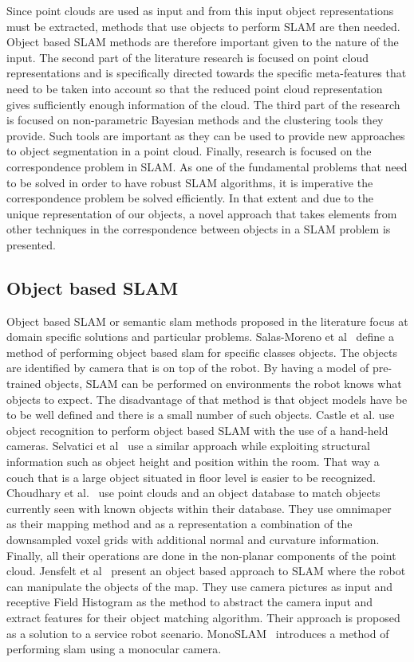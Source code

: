 \documentclass[twoside,hidelinks]{article}
\begin{document}
Since point clouds are used as input and from this input object representations must be extracted, methods that use objects to perform SLAM are then needed. Object based SLAM methods are therefore important given to the nature of the input. The second part of the literature research is focused on point cloud representations and is specifically directed towards the specific meta-features that need to be taken into account so that the reduced point cloud representation gives sufficiently enough information of the cloud. The third part of the research is focused on non-parametric Bayesian methods and the clustering tools they provide. Such tools are important as they can be used to provide new approaches to object segmentation in a point cloud. Finally, research is focused on the correspondence problem in SLAM. As one of the fundamental problems that need to be solved in order to have robust SLAM algorithms, it is imperative the correspondence problem be solved efficiently. In that extent and due to the unique representation of our objects, a novel approach that takes elements from other techniques in the correspondence between objects in a SLAM problem is presented.

\subsection{Object based SLAM}
Object based SLAM or semantic slam methods proposed in the literature focus at domain specific solutions and particular problems. Salas-Moreno et al~\cite{slam++} define a method of performing object based slam for specific classes objects. The objects are identified by camera that is on top of the robot. By having a model of pre-trained objects, SLAM can be performed on environments the robot knows what objects to expect. The disadvantage of that method is that object models have be to be well defined and there is a small number of such objects. 
Castle et al. use object recognition to perform object based SLAM with the use of a hand-held cameras. Selvatici et al~\cite{objslam} use a similar approach while exploiting structural information such as object height and position within the room. That way a couch that is a large object situated in floor level is easier to be recognized.
Choudhary et al.~\cite{objectpointslam} use point clouds and an object database to match objects currently seen with known objects within their database. They use omnimaper~\cite{omnimaper} as their mapping method and as a representation a combination of the downsampled  voxel grids with additional normal and curvature information.  Finally, all their operations are done in the non-planar components of the point cloud.
Jensfelt et al~\cite{objslam} present an object based approach to SLAM where the robot can manipulate the objects of the map. They use camera pictures as input and receptive Field Histogram as the method to abstract the camera input and extract features for their object matching algorithm. Their approach is proposed as a solution to a service robot scenario.
MonoSLAM~\cite{monoslam} introduces a method of performing slam using a monocular camera. 
\end{document}
